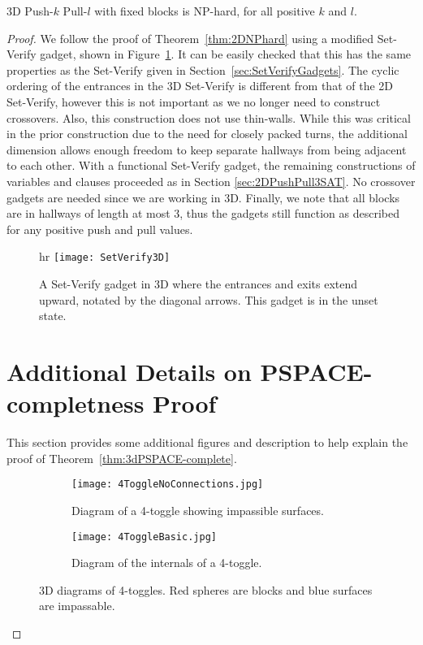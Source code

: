 \begin{theorem}
3D Push-$k$ Pull-$l$ with fixed blocks is NP-hard, for all positive $k$ and $l$.
\end{theorem}
\begin{proof}
We follow the proof of Theorem~\ref{thm:2DNPhard} using a modified Set-Verify gadget, shown in Figure~\ref{fig:3DSetVerify}.  It can be easily checked that this has the same properties as the Set-Verify given in Section~\ref{sec:SetVerifyGadgets}. The cyclic ordering of the entrances in the 3D Set-Verify is different from that of the 2D Set-Verify, however this is not important as we no longer need to construct crossovers. Also, this construction does not use thin-walls. While this was critical in the prior construction due to the need for closely packed turns, the additional dimension allows enough freedom to keep separate hallways from being adjacent to each other. With a functional Set-Verify gadget, the remaining constructions of variables and clauses proceeded as in Section \ref{sec:2DPushPull3SAT}. No crossover gadgets are needed since we are working in 3D. Finally, we note that all blocks are in hallways of length at most 3, thus the gadgets still function as described for any positive push and pull values.

\begin{figure}{hr}
\vspace{-5mm}
  \centering
    \texttt{[image: SetVerify3D]}
    \caption{A Set-Verify gadget in 3D where the entrances and exits extend upward, notated by the diagonal arrows. This gadget is in the unset state.}
    \label{fig:3DSetVerify}
    \vspace{-12mm}
\end{figure}

\section{Additional Details on PSPACE-completness Proof}

This section provides some additional figures and description to help explain the proof of Theorem~\ref{thm:3dPSPACE-complete}.

\begin{figure}[!ht]
  \centering
  \begin{subfigure}[t]{.45\textwidth}
    \texttt{[image: 4ToggleNoConnections.jpg]}
    \caption{Diagram of a 4-toggle showing impassible surfaces.}
    \label{fig:4Toggle3D}
  \end{subfigure}
  \hfill
  \begin{subfigure}[t]{.45\textwidth}
    \texttt{[image: 4ToggleBasic.jpg]}
    \caption{Diagram of the internals of a 4-toggle.}
    \label{fig:4Toggle3DBasic}
  \end{subfigure}
  \caption{3D diagrams of 4-toggles. Red spheres are blocks and blue surfaces are impassable.}
\end{figure}


\end{proof}
